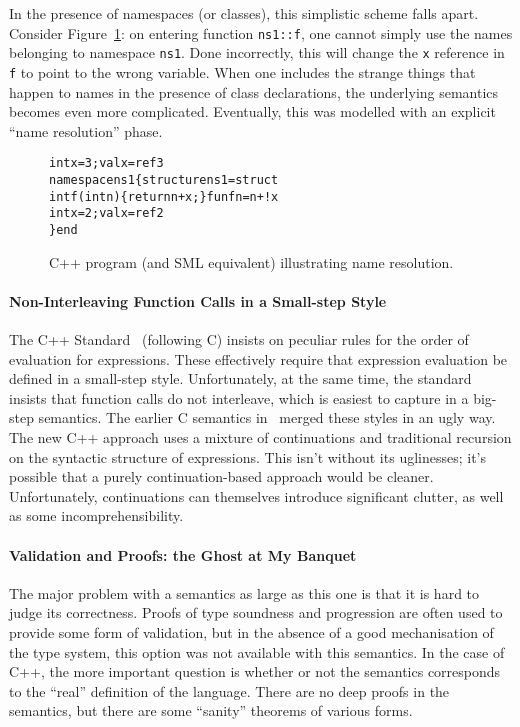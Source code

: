 \documentclass{llncs}
\newcommand{\cpp}{\mbox{C\hspace{-.3mm}+\hspace{-.8mm}+}}
\begin{document}
In the presence of namespaces (or classes), this simplistic scheme
falls apart.  Consider Figure~\ref{fig:nspaces}: on entering function
\texttt{ns1::f}, one cannot simply use the names belonging to
namespace \texttt{ns1}.  Done incorrectly, this will change the
\texttt{x} reference in \texttt{f} to point to the wrong variable.
When one includes the strange things that happen to names in the
presence of class declarations, the underlying semantics becomes even
more complicated.  Eventually, this was modelled with an explicit
``name resolution'' phase.
\begin{figure}
\begin{center}
\begin{minipage}{\textwidth}
\begin{alltt}
   int x = 3;                              val x = ref 3
   namespace ns1 \{                         structure ns1 = struct
     int f(int n) \{ return n + x; \}          fun f n = n + !x
     int x = 2;                              val x = ref 2
   \}                                       end
\end{alltt}
\end{minipage}
\end{center}
\caption{\cpp{} program (and SML equivalent) illustrating name
  resolution. }
\label{fig:nspaces}
\end{figure}


\paragraph{Non-Interleaving Function Calls in a Small-step Style} The
\cpp{} Standard~\cite{cpp-standard-iso14882} (following C) insists on
peculiar rules for the order of evaluation for expressions.  These
effectively require that expression evaluation be defined in a
small-step style.  Unfortunately, at the same time, the standard
insists that function calls do not interleave, which is easiest to
capture in a big-step semantics.  The earlier C semantics
in~\cite{Norrish98} merged these styles in an ugly way.  The new
\cpp{} approach uses a mixture of continuations and traditional
recursion on the syntactic structure of expressions.  This isn't
without its uglinesses; it's possible that a purely continuation-based
approach would be cleaner.  Unfortunately, continuations can
themselves introduce significant clutter, as well as some
incomprehensibility.

\paragraph{Validation and Proofs: the Ghost at My Banquet} The major
problem with a semantics as large as this one is that it is hard to
judge its correctness.  Proofs of type soundness and progression are
often used to provide some form of validation, but in the absence of a
good mechanisation of the type system, this option was not available
with this semantics.  In the case of \cpp, the more important question
is whether or not the semantics corresponds to the ``real'' definition
of the language.  There are no deep proofs in the semantics, but there
are some ``sanity'' theorems of various forms.
\end{document}
